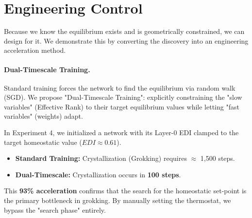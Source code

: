 \section{Engineering Control}\label{sec:engineering}

Because we know the equilibrium exists and is geometrically constrained, we can design for it. We demonstrate this by converting the discovery into an engineering acceleration method.

\paragraph{Dual-Timescale Training.}
Standard training forces the network to find the equilibrium via random walk (SGD). We propose "Dual-Timescale Training": explicitly constraining the "slow variables" (Effective Rank) to their target equilibrium values while letting "fast variables" (weights) adapt.

In Experiment 4, we initialized a network with its Layer-0 EDI clamped to the target homeostatic value ($EDI \approx 0.61$).
\begin{itemize}
    \item \textbf{Standard Training:} Crystallization (Grokking) requires $\approx$ 1,500 steps.
    \item \textbf{Dual-Timescale:} Crystallization occurs in \textbf{100 steps}.
\end{itemize}

This \textbf{93\% acceleration} confirms that the search for the homeostatic set-point is the primary bottleneck in grokking. By manually setting the thermostat, we bypass the "search phase" entirely.
